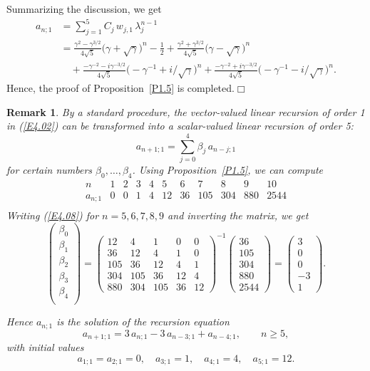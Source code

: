 \documentclass[11pt]{article}
\providecommand{\1}{\mathBB{1}}
\newcommand{\equ}[1]{(\ref{#1})}
\providecommand{\eop}{{}\hfill {}\hfill{$\Box
$}\vspace{0.3cm}\pagebreak[2]\par}
\newtheorem{uremark}[proposition]{Remark}
\begin{document}
Summarizing the discussion, we get
$$\begin{aligned}
a_{n;1}&
=\sum_{j=1}^5C_j\,w_{j,1}\,\lambda_j^{n-1}\\
&=\frac{\gamma^2-\gamma^{3/2}}{4\sqrt{5}}\big(\gamma+\sqrt{\gamma}\big)^n
-\frac12
+\frac{\gamma^2+\gamma^{3/2}}{4\sqrt{5}}\big(\gamma-\sqrt{\gamma}\big)^n\\
&\quad
+\frac{-\gamma^{-2}-i\gamma^{-3/2}}{4\sqrt{5}}\big(-\gamma^{-1}+i/\sqrt{\gamma}\big)^n
+\frac{-\gamma^{-2}+i\gamma^{-3/2}}{4\sqrt{5}}\big(-\gamma^{-1}-i/\sqrt{\gamma}\big)^n.
\end{aligned}
$$
Hence, the proof of Proposition~\ref{P1.5} is completed.\eop

\begin{uremark}\rm
\label{R4.1}
By a standard procedure, the vector-valued linear recursion of order 1 in \equ{E4.02} can be transformed into a scalar-valued linear recursion of order 5:
\begin{equation}
\label{E4.08}
a_{n+1;1}=\sum_{j=0}^4\beta_j\,a_{n-j;1}
\end{equation}
for certain numbers $\beta_0,\ldots,\beta_4$. Using Proposition~\ref{P1.5}, we can compute
$$
\begin{array}{c||c|c|c|c|c|c|c|c|c|c|}
n&1&2&3&4&5&6&7&8&9&10\\\hline
a_{n;1}&0&0&1&4&12&36&105&304&880&2544\\
\end{array}
$$
Writing \equ{E4.08} for $n=5,6,7,8,9$ and inverting the matrix, we get
$$
\left(\begin{array}{c}
\beta_0\\\beta_1\\\beta_2\\\beta_3\\\beta_4\\
\end{array}\right)
=\left(\begin{array}{rrrrr}
12&4&1&0&0\\
36&12&4&1&0\\
105&36&12&4&1\\
304&105&36&12&4\\
880&304&105&36&12
\end{array}
\right)^{-1}
\left(\begin{array}{r}
36\\105\\304\\880\\2544\end{array}\right)
=
\left(\begin{array}{r}
3\\0\\0\\-3\\1\end{array}\right).$$

Hence $a_{n;1}$ is the solution of the recursion equation
\begin{equation}
\label{E4.09}
a_{n+1;1}=3\,a_{n;1}-3\,a_{n-3;1}+a_{n-4;1},\qquad n\geq5,\end{equation}
with initial values
\[a_{1;1}=a_{2;1}=0,\quad a_{3;1}=1,\quad a_{4;1}=4,\quad a_{5;1}=12.\tag*{$\Diamond$}\]
\end{uremark}
\end{document}
